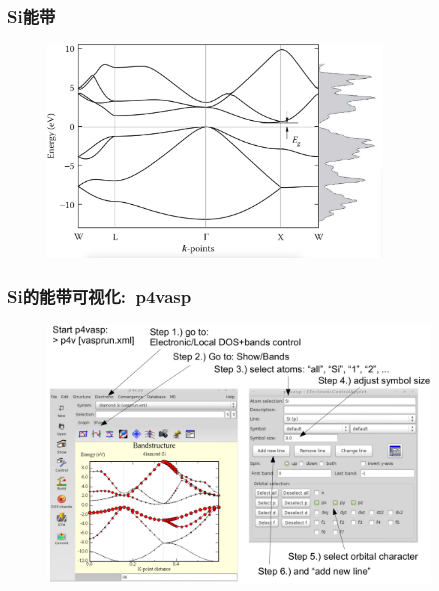 \frame
{
	\frametitle{\textrm{Si}能带}
\begin{figure}[h!]
	\vskip -8pt
\centering
\includegraphics[width=3.5in,viewport=0 10 920 610,clip]{Figures/Si_Band-DOS.png}
\caption{\fontsize{6.2pt}{5.2pt}}%
\label{Si_Band-DOS}
\end{figure}
{\fontsize{6.2pt}{5.2pt}}
}

%
\frame
{
	\frametitle{\textrm{Si}的能带可视化:~\textrm{p4vasp}}
\begin{figure}[h!]
\centering
\includegraphics[width=4.0in]{Figures/VASP_cdSi_3.png}
\label{Fig:VASP-Si_p4vasp}
\end{figure}
}

